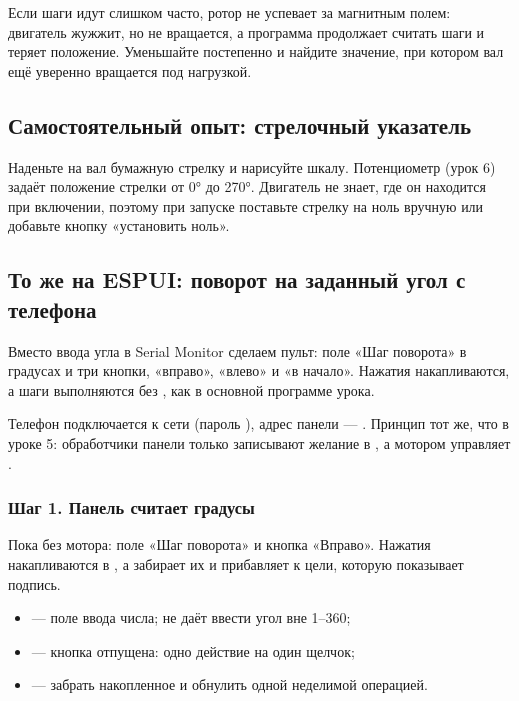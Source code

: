 \begin{tip}
Если шаги идут слишком часто, ротор не успевает за магнитным полем: двигатель жужжит, но не вращается,
а программа продолжает считать шаги и теряет положение. Уменьшайте  постепенно и найдите
значение, при котором вал ещё уверенно вращается под нагрузкой.
\end{tip}

\subsection{Самостоятельный опыт: стрелочный указатель}

Наденьте на вал бумажную стрелку и нарисуйте шкалу. Потенциометр (урок 6) задаёт положение стрелки от
0° до 270°. Двигатель не знает, где он находится при включении, поэтому при запуске поставьте стрелку
на ноль вручную или добавьте кнопку «установить ноль».

\subsection{То же на ESPUI: поворот на заданный угол с телефона}

Вместо ввода угла в Serial Monitor сделаем пульт: поле «Шаг поворота» в градусах и три кнопки,
«вправо», «влево» и «в начало». Нажатия накапливаются, а шаги выполняются без , как
в основной программе урока.

Телефон подключается к сети  (пароль ), адрес панели ---
. Принцип тот же, что в уроке 5: обработчики панели только записывают
желание в , а мотором управляет .

\subsubsection{Шаг 1. Панель считает градусы}

Пока без мотора: поле «Шаг поворота» и кнопка «Вправо». Нажатия накапливаются в ,
а  забирает их и прибавляет к цели, которую показывает подпись.


\begin{itemize}[leftmargin=*]
  \item {} --- поле ввода числа;  не даёт ввести угол вне 1--360;
  \item {} --- кнопка отпущена: одно действие на один щелчок;
  \item {} --- забрать накопленное и обнулить одной неделимой операцией.
\end{itemize}

